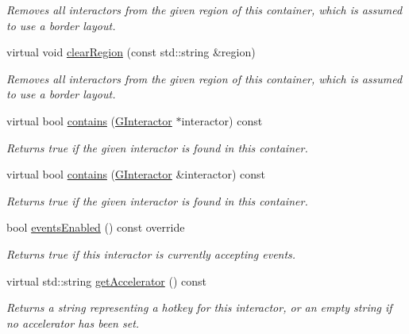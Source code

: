 \begin{DoxyCompactItemize}
\begin{DoxyCompactList}\small\item\em Removes all interactors from the given region of this container, which is assumed to use a border layout. \end{DoxyCompactList}\item 
virtual void \mbox{\hyperlink{classsgl_1_1GContainer_aeba526cb4d6d6f3d8d6f376656af8dc8}{clear\+Region}} (const std\+::string \&region)
\begin{DoxyCompactList}\small\item\em Removes all interactors from the given region of this container, which is assumed to use a border layout. \end{DoxyCompactList}\item 
virtual bool \mbox{\hyperlink{classsgl_1_1GContainer_a29e67f98cd36414c67475b8941d861a6}{contains}} (\mbox{\hyperlink{classsgl_1_1GInteractor}{G\+Interactor}} $\ast$interactor) const
\begin{DoxyCompactList}\small\item\em Returns true if the given interactor is found in this container. \end{DoxyCompactList}\item 
virtual bool \mbox{\hyperlink{classsgl_1_1GContainer_a62fe1c67f06f657fea8b9b28672516a0}{contains}} (\mbox{\hyperlink{classsgl_1_1GInteractor}{G\+Interactor}} \&interactor) const
\begin{DoxyCompactList}\small\item\em Returns true if the given interactor is found in this container. \end{DoxyCompactList}\item 
bool \mbox{\hyperlink{classsgl_1_1GInteractor_a597a370b592e3737d38d9d2f4e2031ea}{events\+Enabled}} () const override
\begin{DoxyCompactList}\small\item\em Returns true if this interactor is currently accepting events. \end{DoxyCompactList}\item 
virtual std\+::string \mbox{\hyperlink{classsgl_1_1GInteractor_a69f8d23ed8f207fbecad99960776e942}{get\+Accelerator}} () const
\begin{DoxyCompactList}\small\item\em Returns a string representing a hotkey for this interactor, or an empty string if no accelerator has been set. \end{DoxyCompactList}\item 

\end{DoxyCompactItemize}
